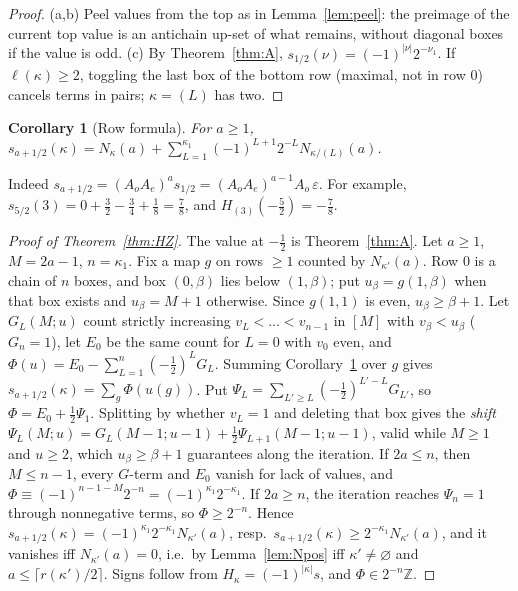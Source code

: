 \documentclass[submission]{FPSAC2027}
\newtheorem{corollary}[theorem]{Corollary}
\theoremstyle{definition}
\theoremstyle{remark}
\newcommand{\Z}{\mathbb{Z}}
\begin{document}
\begin{proof}
(a,b) Peel values from the top as in Lemma~\ref{lem:peel}: the preimage of the current top value
is an antichain up-set of what remains, without diagonal boxes if the value is odd. (c) By
Theorem~\ref{thm:A}, $s_{1/2}(\nu)=(-1)^{|\nu|}2^{-\nu_1}$. If $\ell(\kappa)\ge2$, toggling the last
box of the bottom row (maximal, not in row $0$) cancels terms in pairs; $\kappa=(L)$ has two.
\end{proof}

\begin{corollary}[Row formula]\label{cor:row}
For $a\ge1$, $s_{a+1/2}(\kappa)=N_\kappa(a)+\sum_{L=1}^{\kappa_1}(-1)^{L+1}2^{-L}N_{\kappa/(L)}(a)$.
\end{corollary}

Indeed $s_{a+1/2}=(A_oA_e)^as_{1/2}=(A_oA_e)^{a-1}A_o\,\varepsilon$. For example,
$s_{5/2}(3)=0+\tfrac32-\tfrac34+\tfrac18=\tfrac78$, and $H_{(3)}(-\tfrac52)=-\tfrac78$.

\begin{proof}[Proof of Theorem~\ref{thm:HZ}]
The value at $-\tfrac12$ is Theorem~\ref{thm:A}. Let $a\ge1$, $M=2a-1$, $n=\kappa_1$. Fix a map $g$
on rows $\ge1$ counted by $N_{\kappa'}(a)$. Row $0$ is a chain of $n$ boxes, and box $(0,\beta)$ lies
below $(1,\beta)$; put $u_\beta=g(1,\beta)$ when that box exists and $u_\beta=M+1$ otherwise. Since
$g(1,1)$ is even, $u_\beta\ge\beta+1$. Let $G_L(M;u)$ count strictly increasing
$v_L<\dots<v_{n-1}$ in $[M]$ with $v_\beta<u_\beta$ ($G_n=1$), let $E_0$ be the same count for
$L=0$ with $v_0$ even, and $\Phi(u)=E_0-\sum_{L=1}^n(-\tfrac12)^LG_L$. Summing
Corollary~\ref{cor:row} over $g$ gives $s_{a+1/2}(\kappa)=\sum_g\Phi(u(g))$. Put
$\Psi_L=\sum_{L'\ge L}(-\tfrac12)^{L'-L}G_{L'}$, so $\Phi=E_0+\tfrac12\Psi_1$. Splitting by
whether $v_L=1$ and deleting that box gives the \emph{shift}
$\Psi_L(M;u)=G_L(M-1;u-1)+\tfrac12\Psi_{L+1}(M-1;u-1)$, valid while $M\ge1$ and $u\ge2$, which
$u_\beta\ge\beta+1$ guarantees along the iteration. If $2a\le n$, then $M\le n-1$, every $G$-term
and $E_0$ vanish for lack of values, and $\Phi\equiv(-1)^{n-1-M}2^{-n}=(-1)^{\kappa_1}2^{-\kappa_1}$.
If $2a\ge n$, the iteration reaches $\Psi_n=1$ through nonnegative terms, so $\Phi\ge2^{-n}$. Hence
$s_{a+1/2}(\kappa)=(-1)^{\kappa_1}2^{-\kappa_1}N_{\kappa'}(a)$, resp.\
$s_{a+1/2}(\kappa)\ge2^{-\kappa_1}N_{\kappa'}(a)$, and it vanishes iff $N_{\kappa'}(a)=0$, i.e.\ by
Lemma~\ref{lem:Npos} iff $\kappa'\ne\varnothing$ and $a\le\lceil r(\kappa')/2\rceil$. Signs follow
from $H_\kappa=(-1)^{|\kappa|}s$, and $\Phi\in2^{-n}\Z$.
\end{proof}
\end{document}
